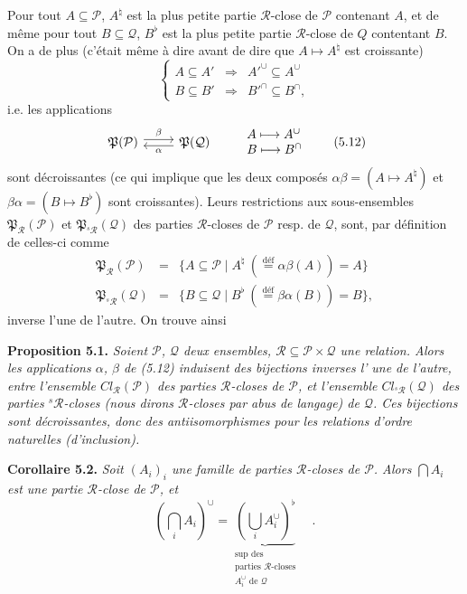 \documentclass[11pt]{article}
\newcommand{\msp}[1]{\marginpar{\footnotesize [#1]}}
\newcommand{\cP}{\mathcal{P}}
\newcommand{\cQ}{\mathcal{Q}}
\newcommand{\cR}{\mathcal{R}}
\newcommand{\fP}{\mathfrak{P}}
\newcommand{\sR}{{}^{s}\mathcal{R}}
\begin{document}
Pour tout $A \subseteq \cP$, $A^{\natural}$ est la plus petite partie $\cR$-close de $\cP$ contenant $A$, et de même pour tout $B \subseteq \cQ$, $B^{\flat}$ est la plus petite partie $\cR$-close de $Q$ contentant $B$. On a de plus (c'était même à dire avant de dire que $A \longmapsto A^{\natural}$ est croissante) %
\[
\left\{
\begin{array}{rcl}
A \subseteq A' & \Longrightarrow & A'^{\cup} \subseteq A^{\cup}\\[1ex]
B \subseteq B' & \Longrightarrow & B'^{\cap} \subseteq B^{\cap},
\end{array}
\right.
\tag*{(5.11)}
\]
i.e. les applications
\[
\begin{tikzcd}
\fP(\cP) \arrow[r, shift left, "\beta"] & \fP(\cQ) \arrow[l, shift left, "\alpha"]
\end{tikzcd}
\qquad
\begin{array}{l}
A \longmapsto A^{\cup}\\
B \longmapsto B^{\cap}
\end{array}
\tag*{(5.12)}
\]
sont décroissantes (ce qui implique que les deux composés $\alpha\beta = (A \longmapsto A^{\natural})$ et $\beta\alpha = (B \longmapsto B^{\flat})$ sont croissantes). Leurs restrictions aux sous-ensembles $\fP_{\cR}(\cP)$ et $\fP_{\sR}(\cQ)$ des parties $\cR$-closes de $\cP$ resp. de $\cQ$, sont, par définition de celles-ci comme
\[
\begin{array}{rcl}
\fP_{\cR}(\cP) & = & \{A \subseteq \cP \mid A^{\natural} \ (\overset{\text{déf}}{=} \alpha\beta(A)) = A\}\\
\fP_{\sR}(\cQ) & = & \{B \subseteq \cQ \mid B^{\flat} \ (\overset{\text{déf}}{=} \beta\alpha(B)) = B\},
\end{array}
\]
inverse l'une de l'autre. On trouve ainsi

\textbf{Proposition 5.1.} \textit{Soient $\cP$, $\cQ$ deux ensembles, $\cR \subseteq \cP \times \cQ$ une relation. Alors les applications $\alpha$, $\beta$ de (5.12) induisent des bijections inverses l'}
\msp{73}
\textit{une de l'autre, entre l'ensemble $\mathit{Cl}_{\cR}(\cP)$ des parties $\cR$-closes de $\cP$, et l'ensemble $\mathit{Cl}_{\sR}(\cQ)$ des parties ${}^{s}\cR$-closes (nous dirons $\cR$-closes par abus de langage) de $\cQ$. Ces bijections sont décroissantes, donc des antiisomorphismes pour les relations d'ordre naturelles (d'inclusion).}

\textbf{Corollaire 5.2.} \textit{Soit $(A_i)_i$ une famille de parties $\cR$-closes de $\cP$. Alors $\bigcap A_i$ est une partie $\cR$-close de $\cP$, et}
\[
(\bigcap_i A_i)^{\cup} = \underbrace{(\bigcup_i A_i^{\cup})^{\flat}}_{\substack{\text{sup des}\\ \text{parties } \cR\text{-closes}\\ A_i^{\cup} \text{ de } \cQ}} \quad .
\tag*{(5.2.1)}
\]
\end{document}
